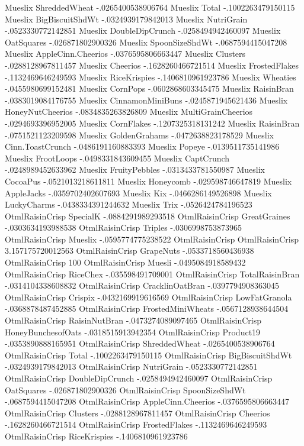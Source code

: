 Mueslix	ShreddedWheat	-.0265400538906764
Mueslix	Total	-.1002263479150115
Mueslix	BigBiscuitShdWt	-.0324939179842013
Mueslix	NutriGrain	-.0523330772142851
Mueslix	DoubleDipCrunch	-.0258494942460097
Mueslix	OatSquares	-.026871802900326
Mueslix	SpoonSizeShdWt	-.0687594415047208
Mueslix	AppleCinn.Cheerios	-.0376595806663447
Mueslix	Clusters	-.0288128967811457
Mueslix	Cheerios	-.1628260466721514
Mueslix	FrostedFlakes	-.1132469646249593
Mueslix	RiceKrispies	-.1406810961923786
Mueslix	Wheaties	-.0455980699152481
Mueslix	CornPops	-.0602868603345475
Mueslix	RaisinBran	-.0383019084176755
Mueslix	CinnamonMiniBuns	-.0245871945621436
Mueslix	HoneyNutCheerios	-.0834835263826809
Mueslix	MultiGrainCheerios	-.0294693396952005
Mueslix	CornFlakes	-.1207325318131242
Mueslix	RaisinBran	-.0751521123209598
Mueslix	GoldenGrahams	-.0472638823178529
Mueslix	Cinn.ToastCrunch	-.0486191160883393
Mueslix	Popeye	-.0139511735141986
Mueslix	FrootLoops	-.0498331843609455
Mueslix	CaptCrunch	-.0248989452633962
Mueslix	FruityPebbles	-.0313433781550987
Mueslix	CocoaPus	-.0521013218611811
Mueslix	Honeycomb	-.029598746647819
Mueslix	AppleJacks	-.0359702402607693
Mueslix	Kix	-.0466286149526898
Mueslix	LuckyCharms	-.0438334391244632
Mueslix	Trix	-.0526424784196523
OtmlRaisinCrisp	SpecialK	-.0884291989293518
OtmlRaisinCrisp	GreatGraines	-.0303634193988538
OtmlRaisinCrisp	Triples	-.0306998753873965
OtmlRaisinCrisp	Mueslix	-.0595774775238522
OtmlRaisinCrisp	OtmlRaisinCrisp	3.157175720012563
OtmlRaisinCrisp	GrapeNuts	-.0533718560436938
OtmlRaisinCrisp	100%
OtmlRaisinCrisp	Muesli	-.0495084918589432
OtmlRaisinCrisp	RiceChex	-.035598491709001
OtmlRaisinCrisp	TotalRaisinBran	-.0314104338608832
OtmlRaisinCrisp	CracklinOatBran	-.0397794908363045
OtmlRaisinCrisp	Crispix	-.0432169919616569
OtmlRaisinCrisp	LowFatGranola	-.0368878487452885
OtmlRaisinCrisp	FrostedMiniWheats	-.0567128938644504
OtmlRaisinCrisp	RaisinNutBran	-.0473274089097465
OtmlRaisinCrisp	HoneyBunchesofOats	-.0318515913942354
OtmlRaisinCrisp	Product19	-.0353890888165951
OtmlRaisinCrisp	ShreddedWheat	-.0265400538906764
OtmlRaisinCrisp	Total	-.1002263479150115
OtmlRaisinCrisp	BigBiscuitShdWt	-.0324939179842013
OtmlRaisinCrisp	NutriGrain	-.0523330772142851
OtmlRaisinCrisp	DoubleDipCrunch	-.0258494942460097
OtmlRaisinCrisp	OatSquares	-.026871802900326
OtmlRaisinCrisp	SpoonSizeShdWt	-.0687594415047208
OtmlRaisinCrisp	AppleCinn.Cheerios	-.0376595806663447
OtmlRaisinCrisp	Clusters	-.0288128967811457
OtmlRaisinCrisp	Cheerios	-.1628260466721514
OtmlRaisinCrisp	FrostedFlakes	-.1132469646249593
OtmlRaisinCrisp	RiceKrispies	-.1406810961923786
